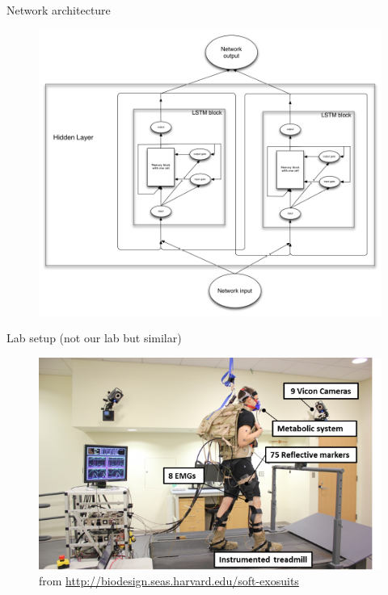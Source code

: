 \documentclass{beamer}
\begin{document}
\begin{frame}{Network architecture}
    \begin{figure}[H]
        \begin{center}
        \includegraphics[height=.7\textheight]{figures/lstm2.png}
        \end{center}
    \end{figure}
\end{frame}
\begin{frame}{Lab setup (not our lab but similar)}
    \begin{figure}[H]
        \begin{center}
        \includegraphics[height=.7\textheight]{figures/treadmill.png} \\
        \tiny from \url{http://biodesign.seas.harvard.edu/soft-exosuits}
        \end{center}
    \end{figure}
\end{frame}
\end{document}
